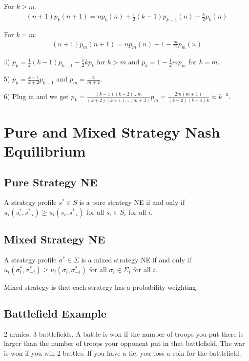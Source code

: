 \documentclass[psamsfonts]{amsart}
\begin{document}
For $k > m$:
\begin{eqnarray}
  (n+1) p_k(n+1) = n p_k(n) + \frac{1}{2} (k-1) p_{k-1}(n) - \frac{k}{2} p_k(n)
\end{eqnarray}

For $k = m$:
\begin{eqnarray}
  (n+1) p_m(n+1) = n p_m(n) + 1  - \frac{m}{2} p_m(n)
\end{eqnarray}

4) $p_k = \frac{1}{2}(k-1) p_{k-1} - \frac{1}{2} k p_k$ for $k > m$ and $p_k = 1 - \frac{1}{2} m p_m$ for $k = m$.

5) $p_k = \frac{k-1}{k+2} p_{k-1}$ and $p_m = \frac{2}{m+2}$.

6) Plug in and we get $p_k = \frac{(k-1)(k-2) \ldots m}{(k+2)(k+1) \ldots(m+3)} p_m = \frac{2m(m+1)}{(k+2)(k+1) k} \approx k^{-3}$. 

\section{Pure and Mixed Strategy Nash Equilibrium}

\subsection{Pure Strategy NE}

A strategy profile $s^* \in S$ is a pure strategy NE if and only if $u_i(s_i^*, s_{-i}^*) \geq u_i(s_i, s_{-i}^*)$ for all $s_i \in S_i$ for all $i$.

\subsection{Mixed Strategy NE}

A strategy profile $\sigma^* \in \Sigma$ is a mixed strategy NE if and only if $u_i(\sigma_i^*, \sigma_{-i}^*) \geq u_i (\sigma_i, \sigma_{-i}^*)$ for all $\sigma_i \in \Sigma_i$ for all $i$.

Mixed strategy is that each strategy has a probability weighting.

\subsection{Battlefield Example}

2 armies, 3 battlefields. A battle is won if the number of troops you put there is larger than the number of troops your opponent put in that battlefield. The war is won if you win 2 battles. If you have a tie, you toss a coin for the battlefield.
\end{document}
